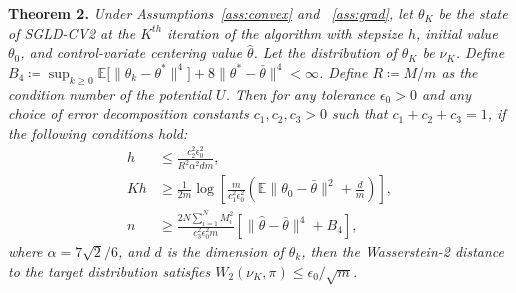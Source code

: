 \textbf{Theorem 2.}  \textit{Under Assumptions~\ref{ass:convex} and ~\ref{ass:grad}, let $\theta_K$ be the state of SGLD-CV2 at the $K^{th}$ iteration of the algorithm with stepsize $h$, initial value $\theta_0$, and control-variate centering value $\hat\theta$. Let the distribution of $\theta_K$ be $\nu_K$. Define $B_4 \coloneqq \sup_{k \geq 0} \mathbb{E}\big[\|\theta_k - \theta^*\|^4\big] + 8\|\theta^* - \bar\theta\|^4< \infty$. Define $R \coloneqq M/m$ as the condition number of the potential $U$. Then for any tolerance $\epsilon_0 > 0$ and any choice of error decomposition constants $c_1, c_2, c_3 > 0$ such that $c_1 + c_2 + c_3 = 1$, if the following conditions hold:}
\begin{align}
    h &\leq \frac{c_2^2 \epsilon_0^2}{R^2 \alpha^2 d m}, \label{eq:cond_h} \\
    K h &\geq \frac{1}{2m} \log\left[ \frac{m}{c_1^2 \epsilon_0^2} \left( \mathbb{E}\|\theta_0 - \bar\theta\|^2 + \frac{d}{m} \right) \right], \label{eq:cond_K} \\
    n &\geq \frac{2 N \sum_{i=1}^N M_i^2}{c_3^2 \epsilon_0^2 m} \left[ \|\hat\theta - \bar\theta\|^4 + B_4 \right], \label{eq:cond_n}
\end{align}
\textit{where $\alpha = 7\sqrt{2}/6$, and $d$ is the dimension of $\theta_k$, then the Wasserstein-2 distance to the target distribution satisfies $W_2(\nu_K, \pi) \leq \epsilon_0 / \sqrt{m}$.}

